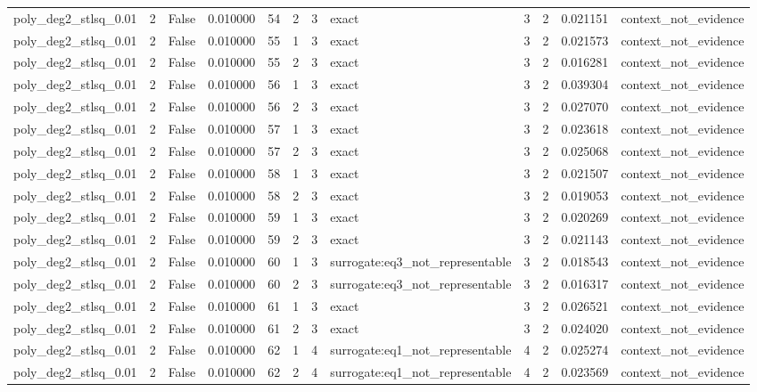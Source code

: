 \begin{tabular}{lrrrrrrlrrrl}
poly\_deg2\_stlsq\_0.01 & 2 & False & 0.010000 & 54 & 2 & 3 & exact & 3 & 2 & 0.021151 & context\_not\_evidence \\
poly\_deg2\_stlsq\_0.01 & 2 & False & 0.010000 & 55 & 1 & 3 & exact & 3 & 2 & 0.021573 & context\_not\_evidence \\
poly\_deg2\_stlsq\_0.01 & 2 & False & 0.010000 & 55 & 2 & 3 & exact & 3 & 2 & 0.016281 & context\_not\_evidence \\
poly\_deg2\_stlsq\_0.01 & 2 & False & 0.010000 & 56 & 1 & 3 & exact & 3 & 2 & 0.039304 & context\_not\_evidence \\
poly\_deg2\_stlsq\_0.01 & 2 & False & 0.010000 & 56 & 2 & 3 & exact & 3 & 2 & 0.027070 & context\_not\_evidence \\
poly\_deg2\_stlsq\_0.01 & 2 & False & 0.010000 & 57 & 1 & 3 & exact & 3 & 2 & 0.023618 & context\_not\_evidence \\
poly\_deg2\_stlsq\_0.01 & 2 & False & 0.010000 & 57 & 2 & 3 & exact & 3 & 2 & 0.025068 & context\_not\_evidence \\
poly\_deg2\_stlsq\_0.01 & 2 & False & 0.010000 & 58 & 1 & 3 & exact & 3 & 2 & 0.021507 & context\_not\_evidence \\
poly\_deg2\_stlsq\_0.01 & 2 & False & 0.010000 & 58 & 2 & 3 & exact & 3 & 2 & 0.019053 & context\_not\_evidence \\
poly\_deg2\_stlsq\_0.01 & 2 & False & 0.010000 & 59 & 1 & 3 & exact & 3 & 2 & 0.020269 & context\_not\_evidence \\
poly\_deg2\_stlsq\_0.01 & 2 & False & 0.010000 & 59 & 2 & 3 & exact & 3 & 2 & 0.021143 & context\_not\_evidence \\
poly\_deg2\_stlsq\_0.01 & 2 & False & 0.010000 & 60 & 1 & 3 & surrogate:eq3\_not\_representable & 3 & 2 & 0.018543 & context\_not\_evidence \\
poly\_deg2\_stlsq\_0.01 & 2 & False & 0.010000 & 60 & 2 & 3 & surrogate:eq3\_not\_representable & 3 & 2 & 0.016317 & context\_not\_evidence \\
poly\_deg2\_stlsq\_0.01 & 2 & False & 0.010000 & 61 & 1 & 3 & exact & 3 & 2 & 0.026521 & context\_not\_evidence \\
poly\_deg2\_stlsq\_0.01 & 2 & False & 0.010000 & 61 & 2 & 3 & exact & 3 & 2 & 0.024020 & context\_not\_evidence \\
poly\_deg2\_stlsq\_0.01 & 2 & False & 0.010000 & 62 & 1 & 4 & surrogate:eq1\_not\_representable & 4 & 2 & 0.025274 & context\_not\_evidence \\
poly\_deg2\_stlsq\_0.01 & 2 & False & 0.010000 & 62 & 2 & 4 & surrogate:eq1\_not\_representable & 4 & 2 & 0.023569 & context\_not\_evidence \\

\end{tabular}
